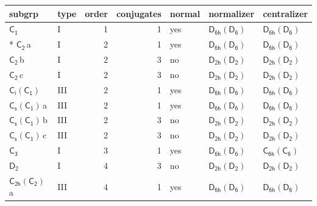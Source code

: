 \documentclass[10pt,a4paper]{article}
\numberwithin{equation}{section}
\newcommand{\grp}[1]{\mathsf{#1}}
\newcommand{\clsletter}[1]{\,{\scriptsize\color{black!55}#1}}
\begin{document}
{\small\begin{longtable}{@{}llrrlll@{}}\toprule
subgrp & type & order & conjugates & normal & normalizer & centralizer\\\midrule\endhead
\bottomrule\endfoot\endlastfoot
\href{../../../rotation/data/pdf/C1.pdf}{$\grp{C_{1}}$} & I & 1 & 1 & yes & \href{D6h-D6.pdf}{$\grp{D_{6h}}(\grp{D_{6}})$} & \href{D6h-D6.pdf}{$\grp{D_{6h}}(\grp{D_{6}})$}\\*
\href{../../../rotation/data/pdf/C2.pdf}{$\grp{C_{2}}$}\clsletter{a} & I & 2 & 1 & yes & \href{D6h-D6.pdf}{$\grp{D_{6h}}(\grp{D_{6}})$} & \href{D6h-D6.pdf}{$\grp{D_{6h}}(\grp{D_{6}})$}\\
\href{../../../rotation/data/pdf/C2.pdf}{$\grp{C_{2}}$}\clsletter{b} & I & 2 & 3 & no & \href{D2h-D2.pdf}{$\grp{D_{2h}}(\grp{D_{2}})$} & \href{D2h-D2.pdf}{$\grp{D_{2h}}(\grp{D_{2}})$}\\
\href{../../../rotation/data/pdf/C2.pdf}{$\grp{C_{2}}$}\clsletter{c} & I & 2 & 3 & no & \href{D2h-D2.pdf}{$\grp{D_{2h}}(\grp{D_{2}})$} & \href{D2h-D2.pdf}{$\grp{D_{2h}}(\grp{D_{2}})$}\\
\href{S2-C1.pdf}{$\grp{C_{i}}(\grp{C_{1}})$} & III & 2 & 1 & yes & \href{D6h-D6.pdf}{$\grp{D_{6h}}(\grp{D_{6}})$} & \href{D6h-D6.pdf}{$\grp{D_{6h}}(\grp{D_{6}})$}\\
\href{C1v-C1.pdf}{$\grp{C_{s}}(\grp{C_{1}})$}\clsletter{a} & III & 2 & 1 & yes & \href{D6h-D6.pdf}{$\grp{D_{6h}}(\grp{D_{6}})$} & \href{D6h-D6.pdf}{$\grp{D_{6h}}(\grp{D_{6}})$}\\
\href{C1v-C1.pdf}{$\grp{C_{s}}(\grp{C_{1}})$}\clsletter{b} & III & 2 & 3 & no & \href{D2h-D2.pdf}{$\grp{D_{2h}}(\grp{D_{2}})$} & \href{D2h-D2.pdf}{$\grp{D_{2h}}(\grp{D_{2}})$}\\
\href{C1v-C1.pdf}{$\grp{C_{s}}(\grp{C_{1}})$}\clsletter{c} & III & 2 & 3 & no & \href{D2h-D2.pdf}{$\grp{D_{2h}}(\grp{D_{2}})$} & \href{D2h-D2.pdf}{$\grp{D_{2h}}(\grp{D_{2}})$}\\
\href{../../../rotation/data/pdf/C3.pdf}{$\grp{C_{3}}$} & I & 3 & 1 & yes & \href{D6h-D6.pdf}{$\grp{D_{6h}}(\grp{D_{6}})$} & \href{C6h-C6.pdf}{$\grp{C_{6h}}(\grp{C_{6}})$}\\
\href{../../../rotation/data/pdf/D2.pdf}{$\grp{D_{2}}$} & I & 4 & 3 & no & \href{D2h-D2.pdf}{$\grp{D_{2h}}(\grp{D_{2}})$} & \href{D2h-D2.pdf}{$\grp{D_{2h}}(\grp{D_{2}})$}\\
\href{C2h-C2.pdf}{$\grp{C_{2h}}(\grp{C_{2}})$}\clsletter{a} & III & 4 & 1 & yes & \href{D6h-D6.pdf}{$\grp{D_{6h}}(\grp{D_{6}})$} & \href{D6h-D6.pdf}{$\grp{D_{6h}}(\grp{D_{6}})$}\\

\end{longtable}}
\end{document}
